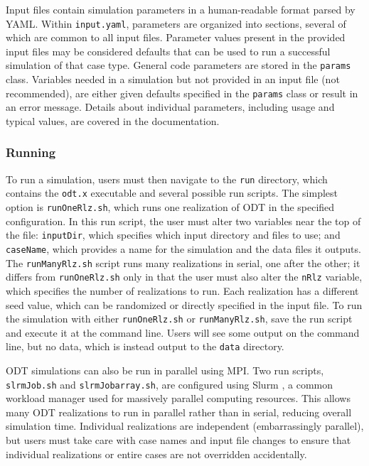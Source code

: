 \documentclass[preprint,12pt, a4paper]{elsarticle}
\begin{document}
Input files contain simulation parameters in a human-readable format parsed by YAML. Within \texttt{input.yaml}, parameters are organized into sections, several of which are common to all input files. Parameter values present in the provided input files may be considered defaults that can be used to run a successful simulation of that case type. General code parameters are stored in the \texttt{params} class. Variables needed in a simulation but not provided in an input file (not recommended), are either given defaults specified in the \texttt{params} class or result in an error message. Details about individual parameters, including usage and typical values, are covered in the documentation.

\subsubsection{Running  }

To run a simulation, users must then navigate to the \texttt{run} directory, which contains the \texttt{odt.x} executable and several possible run scripts. The simplest option is \texttt{runOneRlz.sh}, which runs one realization of ODT in the specified configuration. In this run script, the user must alter two variables near the top of the file: \texttt{inputDir}, which specifies which input directory and files to use; and \texttt{caseName}, which provides a name for the simulation and the data files it outputs. The \texttt{runManyRlz.sh} script runs many realizations in serial, one after the other; it differs from \texttt{runOneRlz.sh} only in that the user must also alter the \texttt{nRlz} variable, which specifies the number of realizations to run. Each realization has a different seed value, which can be randomized or directly specified in the input file. To run the simulation with either \texttt{runOneRlz.sh} or \texttt{runManyRlz.sh}, save the run script and execute it at the command line. Users will see some output on the command line, but no data, which is instead output to the \texttt{data} directory.  

ODT simulations can also be run in parallel using MPI. Two run scripts, \texttt{slrmJob.sh} and \texttt{slrmJob\textunderscore array.sh}, are configured using Slurm \cite{Yoo_2003}, a common workload manager used for massively parallel computing resources. This allows many ODT realizations to run in parallel rather than in serial, reducing overall simulation time. Individual realizations are independent (embarrassingly parallel), but users must take care with case names and input file changes to ensure that individual realizations or entire cases are not overridden accidentally. 
\end{document}

